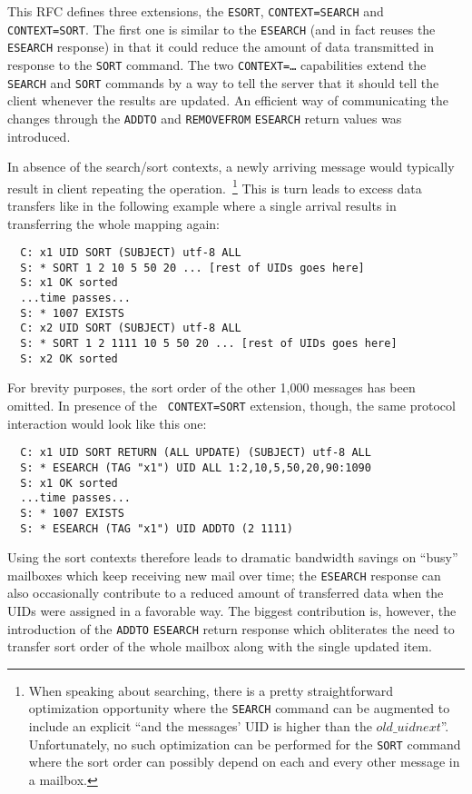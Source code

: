 \documentclass[trojita]{subfiles}
\begin{document}
This RFC defines three extensions, the {\tt ESORT}, {\tt CONTEXT=SEARCH} and {\tt CONTEXT=SORT}.  The first one is
similar to the {\tt ESEARCH} (and in fact reuses the {\tt ESEARCH} response) in that it could reduce the amount of data
transmitted in response to the {\tt SORT} command.  The two {\tt CONTEXT=\ldots} capabilities extend the {\tt SEARCH}
and {\tt SORT} commands by a way to tell the server that it should tell the client whenever the results are updated.  An
efficient way of communicating the changes through the {\tt ADDTO} and {\tt REMOVEFROM} {\tt ESEARCH} return values was
introduced.

In absence of the search/sort contexts, a newly arriving message would typically result in client repeating the
operation.~\footnote{When speaking about searching, there is a pretty straightforward optimization opportunity where the
{\tt SEARCH} command can be augmented to include an explicit ``and the messages' UID is higher than the
$old\_uidnext$''.  Unfortunately, no such optimization can be performed for the {\tt SORT} command where the sort order
can possibly depend on each and every other message in a mailbox.}  This is turn leads to excess data transfers like in
the following example where a single arrival results in transferring the whole mapping again:

\begin{verbatim}
  C: x1 UID SORT (SUBJECT) utf-8 ALL
  S: * SORT 1 2 10 5 50 20 ... [rest of UIDs goes here]
  S: x1 OK sorted
  ...time passes...
  S: * 1007 EXISTS
  C: x2 UID SORT (SUBJECT) utf-8 ALL
  S: * SORT 1 2 1111 10 5 50 20 ... [rest of UIDs goes here]
  S: x2 OK sorted
\end{verbatim}

For brevity purposes, the sort order of the other 1,000 messages has been omitted.  In presence of the {\tt
CONTEXT=SORT} extension, though, the same protocol interaction would look like this one:

\begin{verbatim}
  C: x1 UID SORT RETURN (ALL UPDATE) (SUBJECT) utf-8 ALL
  S: * ESEARCH (TAG "x1") UID ALL 1:2,10,5,50,20,90:1090
  S: x1 OK sorted
  ...time passes...
  S: * 1007 EXISTS
  S: * ESEARCH (TAG "x1") UID ADDTO (2 1111)
\end{verbatim}

Using the sort contexts therefore leads to dramatic bandwidth savings on ``busy'' mailboxes which keep receiving new
mail over time; the {\tt ESEARCH} response can also occasionally contribute to a reduced amount of transferred data when
the UIDs were assigned in a favorable way.  The biggest contribution is, however, the introduction of the {\tt ADDTO}
{\tt ESEARCH} return response which obliterates the need to transfer sort order of the whole mailbox along with the
single updated item.
\end{document}
